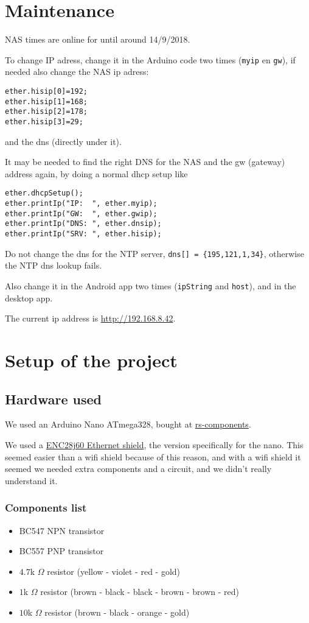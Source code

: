 \documentclass{article}
\begin{document}
	
	\tableofcontents
	\newpage
	
	\section{Maintenance}
		NAS times are online for until around 14/9/2018.
		
		To change IP adress, change it in the Arduino code two times (\verb|myip| en \verb|gw|), if needed also change the NAS ip adress:
		\begin{lstlisting}
ether.hisip[0]=192;
ether.hisip[1]=168;
ether.hisip[2]=178;
ether.hisip[3]=29;
		\end{lstlisting}
		and the dns (directly under it).
		
		It may be needed to find the right DNS for the NAS and the gw (gateway) address again, by doing a normal dhcp setup like
		\begin{lstlisting}
ether.dhcpSetup();
ether.printIp("IP:  ", ether.myip);
ether.printIp("GW:  ", ether.gwip);
ether.printIp("DNS: ", ether.dnsip);
ether.printIp("SRV: ", ether.hisip);
		\end{lstlisting}
		Do not change the dns for the NTP server, \verb|dns[] = {195,121,1,34}|, otherwise the NTP dns lookup fails.
		
		Also change it in the Android app two times (\verb|ipString| and \verb|host|), and in the desktop app.
		
		The current ip address is \url{http://192.168.8.42}.
	
	\section{Setup of the project}
		\subsection{Hardware used}
		We used an Arduino Nano ATmega328, bought at \href{http://nl.rs-online.com/}{rs-components}.
		
		We used a \href{http://www.mijn-gadgets.nl/Webwinkel-Product-157562595/ENC28J60-Ethernet-Shield-Network-Module-V1.0-For-Arduino-Nano.html}{ENC28j60 Ethernet shield}, the version specifically for the nano. This seemed easier than a wifi shield because of this reason, and with a wifi shield it seemed we needed extra components and a circuit, and we didn't really understand it.
		
		\subsubsection{Components list}
			\begin{itemize}
				\item BC547 NPN transistor
				\item BC557 PNP transistor
				\item $4.7$k $\Omega$ resistor (yellow - violet - red - gold)
				\item $1$k $\Omega$ resistor (brown - black - black - brown - brown - red)
				\item $10$k $\Omega$ resistor (brown - black - orange - gold)
			\end{itemize}
	
\end{document}
